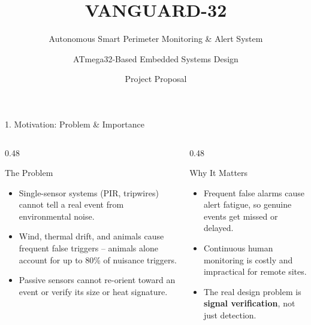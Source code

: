 \documentclass[aspectratio=169, 10pt]{beamer}
\title{VANGUARD-32}
\subtitle{Autonomous Smart Perimeter Monitoring \& Alert System}
\author{ATmega32-Based Embedded Systems Design}
\date{Project Proposal}
\begin{document}
\begin{frame}
    \titlepage
\end{frame}

\begin{frame}{1. Motivation: Problem \& Importance}
    \begin{columns}[T]
        \begin{column}{0.48\textwidth}
            \begin{block}{The Problem}
                \small
                \begin{itemize}
                    \item Single-sensor systems (PIR, tripwires) cannot tell a real event from environmental noise.
                    \item Wind, thermal drift, and animals cause frequent false triggers -- animals alone account for up to 80\% of nuisance triggers.
                    \item Passive sensors cannot re-orient toward an event or verify its size or heat signature.
                \end{itemize}
            \end{block}
        \end{column}
        \begin{column}{0.48\textwidth}
            \begin{block}{Why It Matters}
                \small
                \begin{itemize}
                    \item Frequent false alarms cause alert fatigue, so genuine events get missed or delayed.
                    \item Continuous human monitoring is costly and impractical for remote sites.
                    \item The real design problem is \textbf{signal verification}, not just detection.
                \end{itemize}
            \end{block}
        \end{column}
    \end{columns}
\end{frame}
\end{document}
